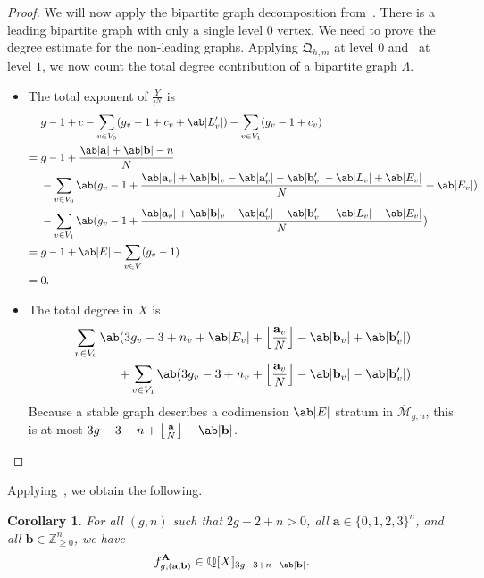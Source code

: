 \documentclass[10pt]{amsart}
\DeclarePairedDelimiter{\floor}{\lfloor}{\rfloor}
\newtheorem{cor}[thm]{Corollary}
\theoremstyle{definition}
\theoremstyle{remark}
\theoremstyle{plain}
\theoremstyle{definition}
\theoremstyle{remark}
\newcommand{\Z}{\mathbb{Z}}
\newcommand{\Q}{\mathbb{Q}}
\newcommand{\ba}{\mathbf{a}}
\newcommand{\bb}{\mathbf{b}}
\newcommand{\bA}{\mathbf{A}}
\newcommand{\msc}[1]{\mathscr{#1}}
\newcommand{\mf}[1]{\mathfrak{#1}}
\newcommand{\ol}[1]{\overline{#1}}
\newcommand{\1}{\mathbf{1}}
\newcommand{\2}{\mathbf{2}}
\newcommand{\3}{\mathbf{3}}
\numberwithin{equation}{section}
\begin{document}
\begin{proof}
    We will now apply the bipartite graph decomposition from~. There is a leading bipartite graph with only a single level $0$ vertex. We need to prove the degree estimate for the non-leading graphs. Applying $\mf{Q}_{h,m}$ at level $0$ and~ at level $1$, we now count the total degree contribution of a bipartite graph $\Lambda$.
    \begin{itemize}
        \item The total exponent of $\frac{Y}{t^N}$ is
            \begin{align*}
                & g-1+c - \sum_{v \in V_0} (g_v-1+c_v+\ab|L'_v|) - \sum_{v \in V_1} (g_v-1+c_v) \\
                ={}& g-1 + \frac{\ab|\ba|+\ab|\bb|-n}{N}\\ 
                &- \sum_{v \in V_0} \ab(g_v-1+\frac{\ab|\ba_v| + \ab|\bb|_v -\ab|\ba'_v| - \ab|\bb'_v| - \ab|L_v| + \ab|E_v|}{N} + \ab|E_v|) \\
                &- \sum_{v \in V_1} \ab(g_v-1+\frac{\ab|\ba_v| + \ab|\bb|_v -\ab|\ba'_v| - \ab|\bb'_v| - \ab|L_v| - \ab|E_v|}{N}) \\
                ={}& g-1 + \ab|E| - \sum_{v \in V} (g_v-1) \\
                ={}& 0.
            \end{align*}
        \item The total degree in $X$ is
            \begin{align*}
                \sum_{v \in V_0} \ab(3g_v-3+n_v + \ab|E_v|+\floor*{\frac{\ba_v}{N}} - \ab|\bb_v| + \ab|\bb'_v|) \\
                + \sum_{v \in V_1} \ab(3g_v - 3 + n_v + \floor*{\frac{\ba_v}{N}} - \ab|\bb_v| - \ab|\bb'_v|)
            \end{align*}
            Because a stable graph describes a codimension $\ab|E|$ stratum in $\ol{\msc{M}}_{g,n}$, this is at most $3g-3+n+\floor*{\frac{\ba}{N}} - \ab|\bb|$. \qedhere
    \end{itemize}
\end{proof}

Applying~, we obtain the following.
\begin{cor}\label{cor:amodelfeynman}
    For all $(g,n)$ such that $2g-2+n > 0$, all $\ba \in \{0,1,2,3\}^n$, and all $\bb \in \Z_{\geq 0}^n$, we have
    \[ f_{g,(\ba,\bb)}^{\bA} \in \Q[X]_{3g-3+n-\ab|\bb|}. \]
\end{cor}
\end{document}
